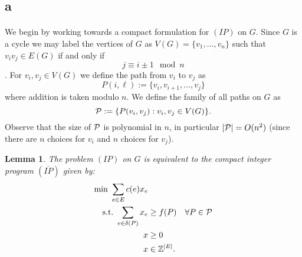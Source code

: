 \documentclass[letterpaper,12pt,oneside,onecolumn]{article}
\newtheorem{lemma}[fact]{Lemma}
\begin{document}
\subsection*{a}
\paragraph{}
We begin by working towards a compact formulation for $(IP)$ on $G$. Since $G$ is a cycle we may label the vertices of $G$ as $V(G) = \{v_1,\dots, v_n\}$ such that $v_iv_j \in E(G)$ if and only if $$j \equiv i\pm1\mod n$$. For $v_i, v_j \in V(G)$ we define the path from $v_i$ to $v_j$ as 
$$P(i, \ell) := \{v_i, v_{i+1}, \dots, v_{j} \}$$
where addition is taken modulo $n$. We define the family of all paths on $G$ as
$$\mathcal{P} := \{P(v_i, v_j) : v_i, v_j \in V(G)\}.$$
Observe that the size of $\mathcal{P}$ is polynomial in $n$, in particular $|\mathcal{P}| = O(n^2)$ (since there are $n$ choices for $v_i$ and $n$ choices for $v_j$).
\begin{lemma}\label{lemma:compact}
The problem $(IP)$ on $G$ is equivalent to the compact integer program $(\overline{IP})$ given by:
\begin{align*}
\min\ \sum_{e\in E} c(e) x_e&\\
\text{s.t.}\  \sum_{e\in\delta(P)} x_e &\geq f(P) &\forall P \in \mathcal{P} \\
x&\geq 0 \\
x&\in \mathbb{Z}^{|E|}.
\end{align*}
\end{lemma}
\end{document}

